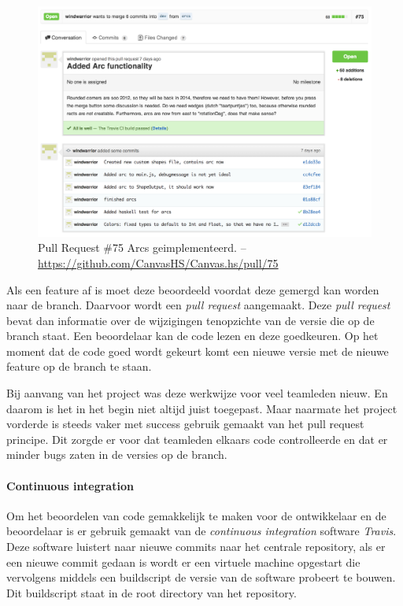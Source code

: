 \begin{figure}
\begin{center}
\includegraphics[keepaspectratio,width=\textwidth]{./images/pullrequest.png}
\caption{Pull Request \#75 Arcs geimplementeerd. – \url{https://github.com/CanvasHS/Canvas.hs/pull/75}}
\label{fig:pullrequest}
\end{center}
\end{figure}

Als een feature af is moet deze beoordeeld voordat deze gemergd kan worden naar de  branch. Daarvoor wordt een \emph{pull request} aangemaakt. Deze \emph{pull request} bevat dan informatie over de wijzigingen tenopzichte van de versie die op de  branch staat. Een beoordelaar kan de code lezen en deze goedkeuren. Op het moment dat de code goed wordt gekeurt komt een nieuwe versie met de nieuwe feature op de  branch te staan.

Bij aanvang van het project was deze werkwijze voor veel teamleden nieuw. En daarom is het in het begin niet altijd juist toegepast. Maar naarmate het project vorderde is steeds vaker met success gebruik gemaakt van het pull request principe. Dit zorgde er voor dat teamleden elkaars code controlleerde en dat er minder bugs zaten in de versies op de  branch.

\paragraph{Continuous integration} Om het beoordelen van code gemakkelijk te maken voor de ontwikkelaar en de beoordelaar is er gebruik gemaakt van de \emph{continuous integration} software \emph{Travis}. Deze software luistert naar nieuwe commits naar het centrale repository, als er een nieuwe commit gedaan is wordt er een virtuele machine opgestart die vervolgens middels een buildscript de versie van de software probeert te bouwen. Dit buildscript staat in de root directory van het repository.

